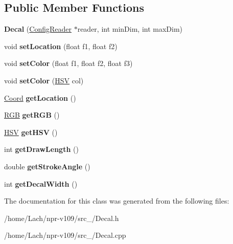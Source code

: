 \subsection*{Public Member Functions}
\begin{DoxyCompactItemize}
\item 
\hypertarget{classDecal_a101d637231bbe15438573ff44481e025}{}\label{classDecal_a101d637231bbe15438573ff44481e025} 
{\bfseries Decal} (\hyperlink{classConfigReader}{Config\+Reader} $\ast$reader, int min\+Dim, int max\+Dim)
\item 
\hypertarget{classDecal_aca34cd0f099e08c77d5309eb1177b6db}{}\label{classDecal_aca34cd0f099e08c77d5309eb1177b6db} 
void {\bfseries set\+Location} (float f1, float f2)
\item 
\hypertarget{classDecal_ad59c6e4cfb8b06e7403aaf7a12a96ba8}{}\label{classDecal_ad59c6e4cfb8b06e7403aaf7a12a96ba8} 
void {\bfseries set\+Color} (float f1, float f2, float f3)
\item 
\hypertarget{classDecal_a4b3153696a223ec85c53e22876023a14}{}\label{classDecal_a4b3153696a223ec85c53e22876023a14} 
void {\bfseries set\+Color} (\hyperlink{structHSV}{H\+SV} col)
\item 
\hypertarget{classDecal_abcf93a8a28597b3e07ca8268af2ef049}{}\label{classDecal_abcf93a8a28597b3e07ca8268af2ef049} 
\hyperlink{structCoord}{Coord} {\bfseries get\+Location} ()
\item 
\hypertarget{classDecal_a88024aec965f854e6ee74867b107963c}{}\label{classDecal_a88024aec965f854e6ee74867b107963c} 
\hyperlink{structRGB}{R\+GB} {\bfseries get\+R\+GB} ()
\item 
\hypertarget{classDecal_a78513a5e1b703ae65933f20f45cf8011}{}\label{classDecal_a78513a5e1b703ae65933f20f45cf8011} 
\hyperlink{structHSV}{H\+SV} {\bfseries get\+H\+SV} ()
\item 
\hypertarget{classDecal_a7d789f497a9019c4ab1fc2377038fc32}{}\label{classDecal_a7d789f497a9019c4ab1fc2377038fc32} 
int {\bfseries get\+Draw\+Length} ()
\item 
\hypertarget{classDecal_ad25e74f9b24b4487713a64fd2b8711c0}{}\label{classDecal_ad25e74f9b24b4487713a64fd2b8711c0} 
double {\bfseries get\+Stroke\+Angle} ()
\item 
\hypertarget{classDecal_ab455f1768097265f73022194f2830861}{}\label{classDecal_ab455f1768097265f73022194f2830861} 
int {\bfseries get\+Decal\+Width} ()
\end{DoxyCompactItemize}


The documentation for this class was generated from the following files\+:\begin{DoxyCompactItemize}
\item 
/home/\+Lach/npr-\/v109/src\+\_/Decal.\+h\item 
/home/\+Lach/npr-\/v109/src\+\_/Decal.\+cpp\end{DoxyCompactItemize}
